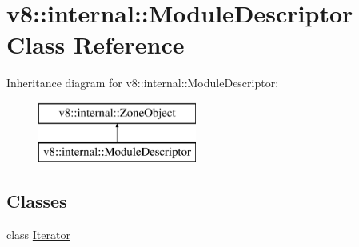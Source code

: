\hypertarget{classv8_1_1internal_1_1_module_descriptor}{}\section{v8\+:\+:internal\+:\+:Module\+Descriptor Class Reference}
\label{classv8_1_1internal_1_1_module_descriptor}
Inheritance diagram for v8\+:\+:internal\+:\+:Module\+Descriptor\+:\begin{figure}[H]
\begin{center}
\leavevmode
\includegraphics[height=2.000000cm]{classv8_1_1internal_1_1_module_descriptor}
\end{center}
\end{figure}
\subsection*{Classes}
\begin{DoxyCompactItemize}
\item 
class \hyperlink{classv8_1_1internal_1_1_module_descriptor_1_1_iterator}{Iterator}
\end{DoxyCompactItemize}
